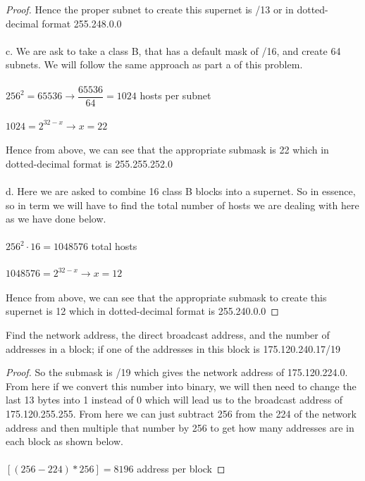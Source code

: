 \documentclass[12pt]{article}
\newenvironment{exercise}[2][Exercise]{\begin{trivlist}
\item[\hskip \labelsep {\bfseries #1}\hskip \labelsep {\bfseries #2.}]}{\end{trivlist}}
\begin{document}
\begin{proof}
Hence the proper subnet to create this supernet is /13 or in dotted-decimal format 255.248.0.0 \\ \\
c. We are ask to take a class B, that has a default mask of /16, and create 64 subnets. We will follow the same approach as part a of this problem. \\ \\
$256^{2} = 65536 \rightarrow \dfrac{65536}{64} = 1024$ hosts per subnet \\ \\ 
$1024 = 2^{32 - x} \rightarrow x = 22$ \\ \\ 
Hence from above, we can see that the appropriate submask is 22 which in dotted-decimal format is 255.255.252.0 \\ \\ 
d. Here we are asked to combine 16 class B blocks into a supernet. So in essence, so in term we will have to find the total number of hosts we are dealing with here as we have done below. \\ \\
$256^{2} \cdot 16 = 1048576$ total hosts \\ \\
$1048576 = 2^{32 - x} \rightarrow x = 12$ \\ \\
Hence from above, we can see that the appropriate submask to create this supernet is 12 which in dotted-decimal format is 255.240.0.0
\end{proof}

\begin{exercise}{8}
Find the network address, the direct broadcast address, and the number of addresses in a block; if one of the addresses in this block is 175.120.240.17/19
\end{exercise}

\begin{proof}
So the submask is /19 which gives the network address of 175.120.224.0. From here if we convert this number into binary, we will then need to change the last 13 bytes into 1 instead of 0 which will lead us to the broadcast address of 175.120.255.255. From here we can just subtract 256 from the 224 of the network address and then multiple that number by 256 to get how many addresses are in each block as shown below.\\ \\
$[(256 - 224) * 256] = 8196$ address per block
\end{proof}
\end{document}
